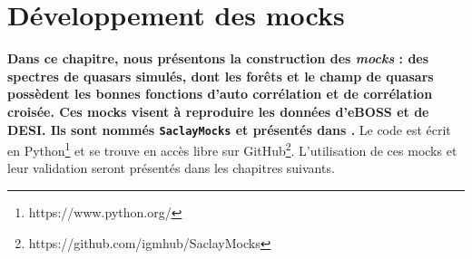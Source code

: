\documentclass[11pt, twoside, a4paper, openright]{report}
\begin{document}

\graphicspath{ {../figures/mocks/} }

\chapter{Développement des mocks}
\minitoc
\newpage
\thispagestyle{fancy}

\textbf{Dans ce chapitre, nous présentons la construction des \emph{mocks} : des spectres de quasars simulés, dont les forêts \lya{} et le champ de quasars possèdent les bonnes fonctions d'auto corrélation et de corrélation croisée.
Ces mocks visent à reproduire les données d'eBOSS et de DESI. Ils sont nommés \texttt{SaclayMocks} et présentés dans \citet{CITE:mocks}.}
Le code est écrit en Python\footnote{https://www.python.org/} et se trouve en accès libre sur GitHub\footnote{https://github.com/igmhub/SaclayMocks}. L'utilisation de ces mocks et leur validation seront présentés dans les chapitres suivants.
\end{document}
